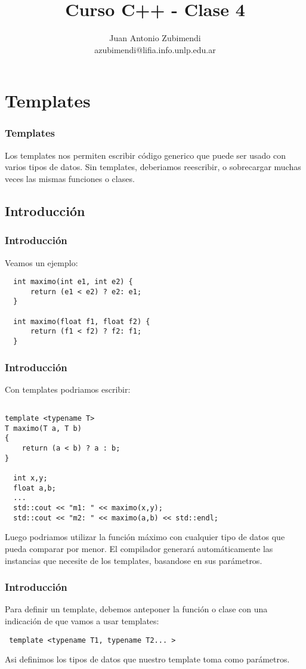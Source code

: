 \documentclass{beamer}
\title{Curso C++ - Clase 4}
\author{Juan Antonio Zubimendi\\azubimendi@lifia.info.unlp.edu.ar}
\institute{LIFIA}
\begin{document}
 
\begin{frame}
\titlepage
\end{frame}

\section{Templates}
\begin{frame}
\frametitle{Templates}
Los templates nos permiten escribir código generico que puede ser usado con varios tipos de datos.
Sin templates, deberiamos reescribir, o sobrecargar muchas veces las mismas funciones o clases.\\
\end{frame}

\subsection{Introducción}
\begin{frame}[fragile]
\frametitle{Introducción}
Veamos un ejemplo:

\begin{verbatim}
  int maximo(int e1, int e2) {
      return (e1 < e2) ? e2: e1;
  }

  int maximo(float f1, float f2) {
      return (f1 < f2) ? f2: f1;
  }
\end{verbatim}

\end{frame}

\begin{frame}[fragile]
\frametitle{Introducción}
Con templates podriamos escribir: 
\begin{verbatim}

template <typename T>
T maximo(T a, T b)
{
    return (a < b) ? a : b;
}

  int x,y;
  float a,b;
  ...
  std::cout << "m1: " << maximo(x,y);
  std::cout << "m2: " << maximo(a,b) << std::endl;  
\end{verbatim}
Luego podriamos utilizar la función máximo con cualquier tipo de datos que pueda comparar por menor.
El compilador generará automáticamente las instancias que necesite de los templates, basandose en sus parámetros.
\end{frame}

\begin{frame}[fragile]
\frametitle{Introducción}

Para definir un template, debemos anteponer la función o clase con una indicación de que vamos a
usar templates:

\begin{verbatim}
 template <typename T1, typename T2... >
\end{verbatim}

Asi definimos los tipos de datos que nuestro template toma como parámetros.
\end{frame}
\end{document}
